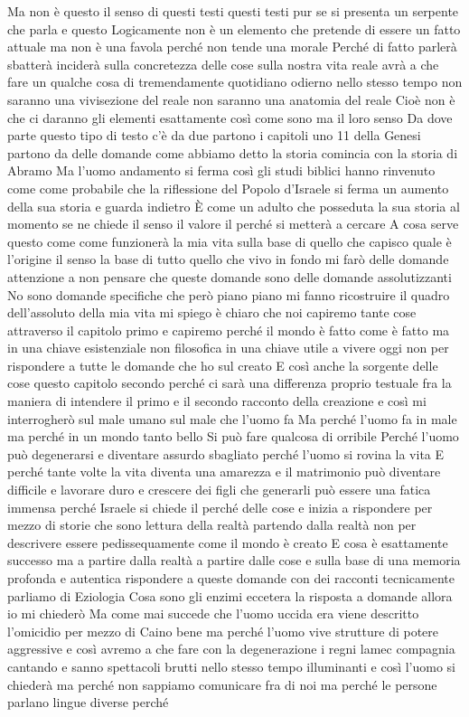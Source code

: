 Ma non è questo il senso di questi testi questi testi pur se si presenta un serpente che parla e questo Logicamente non è un elemento che pretende di essere un fatto attuale ma non è una favola perché non tende una morale Perché di fatto parlerà sbatterà inciderà sulla concretezza delle cose sulla nostra vita reale avrà a che fare un qualche cosa di tremendamente quotidiano odierno
nello stesso tempo non saranno una vivisezione del reale non saranno una anatomia del reale Cioè non è che ci daranno gli elementi esattamente così come sono ma il loro senso Da dove parte questo tipo di testo c'è da due partono i capitoli uno 11 della Genesi partono da delle domande come abbiamo detto la storia comincia con la storia di Abramo Ma l'uomo andamento si ferma così gli studi biblici hanno rinvenuto come come probabile che la riflessione del Popolo d'Israele si ferma un aumento della sua storia e guarda indietro È come un adulto che posseduta la sua storia al momento se ne chiede il senso
il valore il perché si metterà a cercare A cosa serve questo come come funzionerà la mia vita sulla base di quello che capisco quale è l'origine il senso la base di tutto quello che vivo in fondo mi farò delle domande attenzione a non pensare che queste domande sono delle domande assolutizzanti No sono domande specifiche che però piano piano mi fanno ricostruire il quadro dell'assoluto della mia vita mi spiego è chiaro che noi capiremo tante cose attraverso il capitolo primo e capiremo perché il mondo è fatto come è fatto ma in una chiave esistenziale non filosofica in una chiave utile a vivere oggi non per rispondere a tutte le domande che ho sul creato E così anche la sorgente delle cose
questo capitolo secondo perché ci sarà una differenza proprio testuale fra la maniera di intendere il primo e il secondo racconto della creazione e così mi interrogherò sul male umano sul male che l'uomo fa Ma perché l'uomo fa in male ma perché in un mondo tanto bello Si può fare qualcosa di orribile Perché l'uomo può degenerarsi e diventare assurdo sbagliato perché l'uomo si rovina la vita E perché tante volte la vita diventa una amarezza e il matrimonio può diventare difficile e lavorare duro e crescere dei figli che generarli può essere una fatica immensa perché Israele si chiede il perché delle cose e inizia a rispondere per mezzo di storie che sono lettura della realtà partendo dalla realtà non per descrivere
essere pedissequamente come il mondo è creato E cosa è esattamente successo ma a partire dalla realtà a partire dalle cose e sulla base di una memoria profonda e autentica rispondere a queste domande con dei racconti tecnicamente parliamo di Eziologia Cosa sono gli enzimi eccetera la risposta a domande allora io mi chiederò Ma come mai succede che l'uomo uccida era viene descritto l'omicidio per mezzo di Caino bene ma perché l'uomo vive strutture di potere aggressive e così avremo a che fare con la degenerazione i regni lamec compagnia cantando e sanno spettacoli brutti nello stesso tempo illuminanti e così l'uomo si chiederà ma perché non sappiamo comunicare fra di noi ma perché le persone parlano lingue diverse perché
